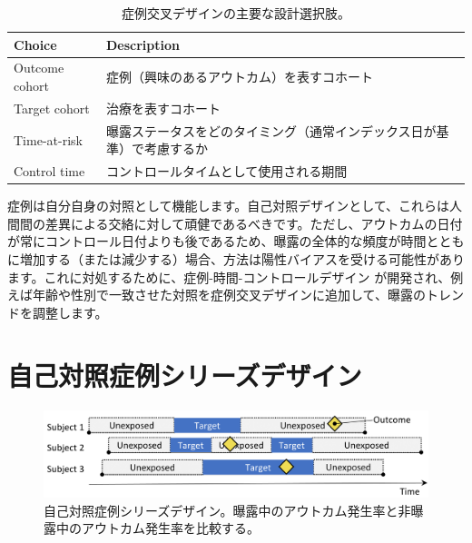 \documentclass[
  11pt]{book}
\theoremstyle{definition}
\theoremstyle{definition}
\theoremstyle{definition}
\theoremstyle{definition}
\theoremstyle{remark}
\begin{document}
\begin{table}
\centering
\caption{\label{tab:ccrChoices}症例交叉デザインの主要な設計選択肢。}
\centering
\begin{tabular}[t]{l>{\raggedright\arraybackslash}p{9cm}}
\toprule
Choice & Description\\
\midrule
Outcome cohort & 症例（興味のあるアウトカム）を表すコホート\\
Target cohort & 治療を表すコホート\\
Time-at-risk & 曝露ステータスをどのタイミング（通常インデックス日が基準）で考慮するか\\
Control time & コントロールタイムとして使用される期間\\
\bottomrule
\end{tabular}
\end{table}

症例は自分自身の対照として機能します。自己対照デザインとして、これらは人間間の差異による交絡に対して頑健であるべきです。ただし、アウトカムの日付が常にコントロール日付よりも後であるため、曝露の全体的な頻度が時間とともに増加する（または減少する）場合、方法は陽性バイアスを受ける可能性があります。これに対処するために、症例-時間-コントロールデザイン \citep{suissa_1995} が開発され、例えば年齢や性別で一致させた対照を症例交叉デザインに追加して、曝露のトレンドを調整します。

\section{自己対照症例シリーズデザイン}\label{ux81eaux5df1ux5bfeux7167ux75c7ux4f8bux30b7ux30eaux30fcux30baux30c7ux30b6ux30a4ux30f3}


\begin{figure}[h]

{\centering \includegraphics[width=0.9\linewidth]{images/PopulationLevelEstimation/selfControlledCaseSeries} 

}

\caption{自己対照症例シリーズデザイン。曝露中のアウトカム発生率と非曝露中のアウトカム発生率を比較する。}\label{fig:selfControlledCaseSeries}
\end{figure}
\end{document}

